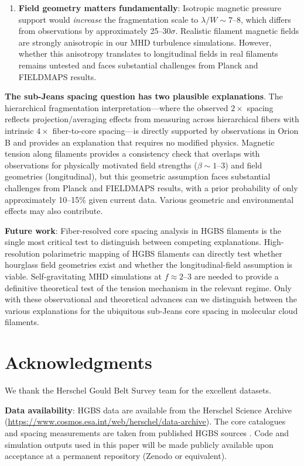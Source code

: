 \documentclass[11pt,a4paper]{article}
\begin{document}
\begin{enumerate}
    \item \textbf{Field geometry matters fundamentally}: Isotropic magnetic pressure support would \textit{increase} the fragmentation scale to $\lambda/W \sim 7$--$8$, which differs from observations by approximately 25--$30\sigma$. Realistic filament magnetic fields are strongly anisotropic in our MHD turbulence simulations. However, whether this anisotropy translates to longitudinal fields in real filaments remains untested and faces substantial challenges from Planck and FIELDMAPS results.
\end{enumerate}

\textbf{The sub-Jeans spacing question has two plausible explanations}. The hierarchical fragmentation interpretation—where the observed $2\times$ spacing reflects projection/averaging effects from measuring across hierarchical fibers with intrinsic $4\times$ fiber-to-core spacing—is directly supported by observations in Orion B \citep{Yang2024} and provides an explanation that requires no modified physics. Magnetic tension along filaments provides a consistency check that overlaps with observations for physically motivated field strengths ($\beta \sim 1$--$3$) and field geometries (longitudinal), but this geometric assumption faces substantial challenges from Planck and FIELDMAPS results, with a prior probability of only approximately 10--15\% given current data. Various geometric and environmental effects may also contribute.

\textbf{Future work}: Fiber-resolved core spacing analysis in HGBS filaments is the single most critical test to distinguish between competing explanations. High-resolution polarimetric mapping of HGBS filaments can directly test whether hourglass field geometries exist and whether the longitudinal-field assumption is viable. Self-gravitating MHD simulations at $f \approx 2$--$3$ are needed to provide a definitive theoretical test of the tension mechanism in the relevant regime. Only with these observational and theoretical advances can we distinguish between the various explanations for the ubiquitous sub-Jeans core spacing in molecular cloud filaments.

\section*{Acknowledgments}

We thank the Herschel Gould Belt Survey team for the excellent datasets.

\textbf{Data availability}: HGBS data are available from the Herschel Science Archive (\url{https://www.cosmos.esa.int/web/herschel/data-archive}). The core catalogues and spacing measurements are taken from published HGBS sources \citep{Konyves2015, Konyves2020, Andre2016}. Code and simulation outputs used in this paper will be made publicly available upon acceptance at a permanent repository (Zenodo or equivalent).
\end{document}
